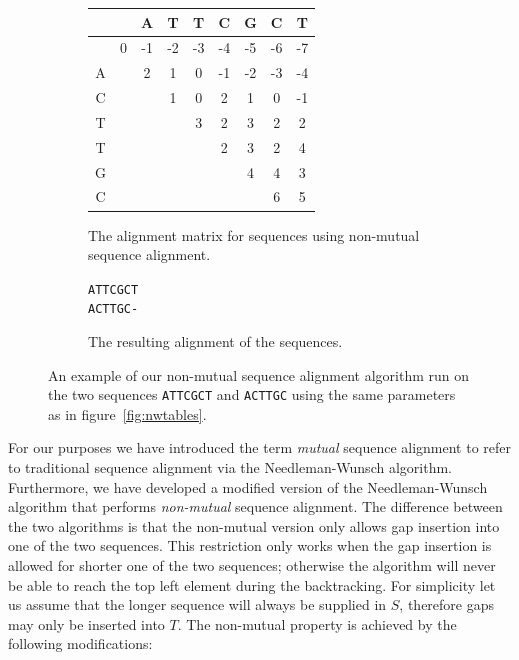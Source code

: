 \documentclass[a4paper]{report}
\begin{document}
\begin{figure}[t]
    \begin{subfigure}[b]{0.55\textwidth}
        \centering
        \begin{tabular}{| c | c | c | c | c | c | c | c | c |}
            \hline
            & & A & T & T & C & G & C & T \\ \hline
            &\cellcolor[gray]{0.9}0 & -1 & -2 & -3 & -4 & -5 & -6 & -7 \\
            \hline
            A & &\cellcolor[gray]{0.9}2 & 1 & 0 & -1 & -2 & -3 & -4 \\
            \hline
            C & & &\cellcolor[gray]{0.9}1 & 0 & 2 & 1 & 0 & -1 \\ \hline
            T & & & &\cellcolor[gray]{0.9}3 & 2 & 3 & 2 & 2 \\ \hline
            T & & & & &\cellcolor[gray]{0.9}2 & 3 & 2 & 4 \\ \hline
            G & & & & & &\cellcolor[gray]{0.9}4 & 4 & 3 \\ \hline
            C & & & & & & &\cellcolor[gray]{0.9}6 &
            \cellcolor[gray]{0.9}5 \\ \hline
        \end{tabular}
        \caption{The alignment matrix for sequences using non-mutual sequence
        alignment.}
        \label{fig:nonmutmatrix}
    \end{subfigure}
    \quad
    \begin{subfigure}[b]{0.4\textwidth}
        \centering
        \texttt{ATTCGCT\\ACTTGC-}
        \caption{The resulting alignment of the sequences.}
        \label{fig:nonmutalign}
    \end{subfigure}
    \caption{An example of our non-mutual sequence alignment algorithm run on
    the two sequences \texttt{ATTCGCT} and \texttt{ACTTGC} using the same
    parameters as in figure~\ref{fig:nwtables}.}
    \label{fig:nonmuttables}
\end{figure}

For our purposes we have introduced the term \emph{mutual} sequence alignment
to refer to traditional sequence alignment via the Needleman-Wunsch algorithm.
Furthermore, we have developed a modified version of the Needleman-Wunsch
algorithm that performs \emph{non-mutual} sequence alignment. The difference
between the two algorithms is that the non-mutual version only allows gap
insertion into one of the two sequences. This restriction only works when the
gap insertion is allowed for shorter one of the two sequences; otherwise the
algorithm will never be able to reach the top left element during the
backtracking. For simplicity let us assume that the longer sequence will always
be supplied in $S$, therefore gaps may only be inserted into $T$. The
non-mutual property is achieved by the following modifications:
\end{document}

